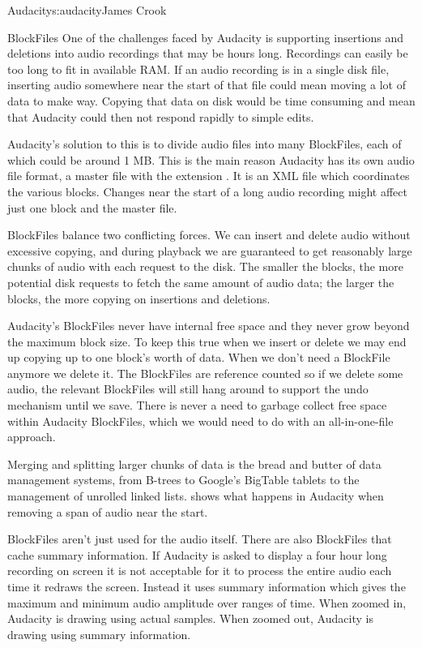 \begin{aosachapter}{Audacity}{s:audacity}{James Crook}
\begin{aosasect1}{BlockFiles}
One of the challenges faced by Audacity is supporting insertions and
deletions into audio recordings that may be hours long.  Recordings
can easily be too long to fit in available RAM\@.  If an audio recording
is in a single disk file, inserting audio somewhere near the start of
that file could mean moving a lot of data to make way.  Copying that
data on disk would be time consuming and mean that Audacity could then
not respond rapidly to simple edits.

Audacity's solution to this is to divide audio files into many
BlockFiles, each of which could be around 1 MB\@.  This is the main
reason Audacity has its own audio file format, a master file with the
extension .  It is an XML file which coordinates the various
blocks.  Changes near the start of a long audio recording might affect
just one block and the master  file.

BlockFiles balance two conflicting forces.  We can insert and delete
audio without excessive copying, and during playback we are guaranteed
to get reasonably large chunks of audio with each request to the disk.
The smaller the blocks, the more potential disk requests to fetch the
same amount of audio data; the larger the blocks, the more copying on
insertions and deletions.

Audacity's BlockFiles never have internal free space and they never
grow beyond the maximum block size.  To keep this true when we insert
or delete we may end up copying up to one block's worth of data.  When
we don't need a BlockFile anymore we delete it.  The BlockFiles are
reference counted so if we delete some audio, the relevant BlockFiles
will still hang around to support the undo mechanism until we save.
There is never a need to garbage collect free space within
Audacity BlockFiles, which we would need to do with an all-in-one-file
approach.

Merging and splitting larger chunks of data is the bread and butter of
data management systems, from B-trees to Google's BigTable tablets to
the management of unrolled linked lists.   shows
what happens in Audacity when removing a span of audio near the start.


BlockFiles aren't just used for the audio itself.  There are also
BlockFiles that cache summary information.  If Audacity is asked to
display a four hour long recording on screen it is not acceptable for
it to process the entire audio each time it redraws the screen.
Instead it uses summary information which gives the maximum and
minimum audio amplitude over ranges of time.  When zoomed in,
Audacity is drawing using actual samples.  When zoomed out,
Audacity is drawing using summary information.


\end{aosasect1}
\end{aosachapter}

